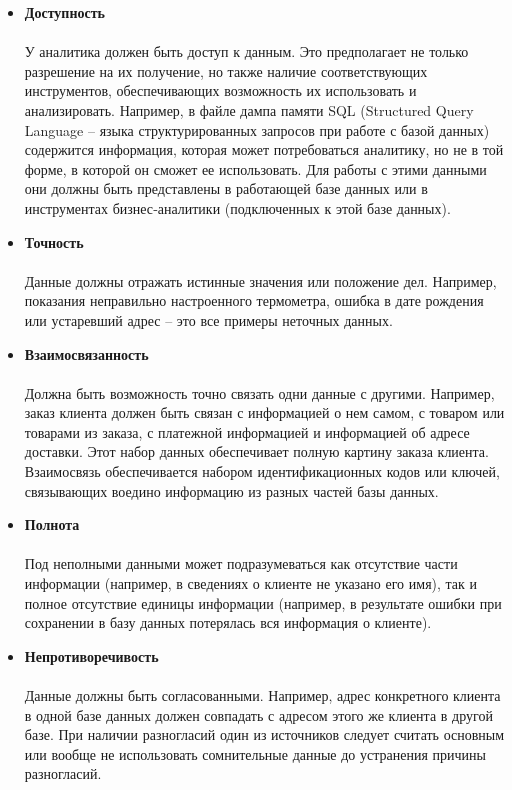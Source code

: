 \documentclass{article}
\begin{document}
\begin{itemize}
    \item \textbf{Доступность} \\ \\
    У аналитика должен быть доступ к данным. Это предполагает не только разрешение на их получение, но также наличие соответствующих инструментов, обеспечивающих возможность их использовать и анализировать. Например, в файле дампа памяти SQL (Structured Query Language – языка структурированных запросов при работе с базой данных) содержится информация, которая может потребоваться аналитику, но не в той форме, в которой он сможет ее использовать. Для работы с этими данными они должны быть представлены в работающей базе данных или в инструментах бизнес‑аналитики (подключенных к этой базе данных).
    \item \textbf{Точность} \\ \\
    Данные должны отражать истинные значения или положение дел. Например, показания неправильно настроенного термометра, ошибка в дате рождения или устаревший адрес – это все примеры неточных данных.
    \item \textbf{Взаимосвязанность} \\ \\
    Должна быть возможность точно связать одни данные с другими. Например, заказ клиента должен быть связан с информацией о нем самом, с товаром или товарами из заказа, с платежной информацией и информацией об адресе доставки. Этот набор данных обеспечивает полную картину заказа клиента. Взаимосвязь обеспечивается набором идентификационных кодов или ключей, связывающих воедино информацию из разных частей базы данных.
    \item \textbf{Полнота} \\ \\
    Под неполными данными может подразумеваться как отсутствие части информации (например, в сведениях о клиенте не указано его имя), так и полное отсутствие единицы информации (например, в результате ошибки при сохранении в базу данных потерялась вся информация о клиенте).
    \item \textbf{Непротиворечивость} \\ \\
    Данные должны быть согласованными. Например, адрес конкретного клиента в одной базе данных должен совпадать с адресом этого же клиента в другой базе. При наличии разногласий один из источников следует считать основным или вообще не использовать сомнительные данные до устранения причины разногласий.

\end{itemize}
\end{document}
